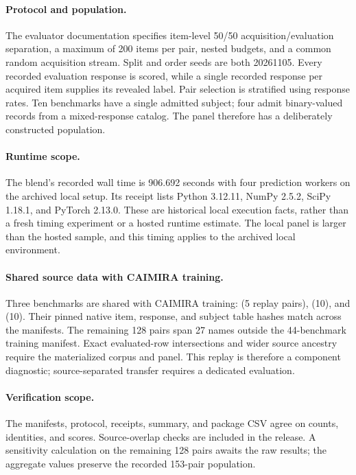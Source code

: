 \paragraph{Protocol and population.}
The evaluator documentation specifies item-level 50/50 acquisition/evaluation separation, a maximum of 200 items per pair, nested budgets, and a common random acquisition stream. Split and order seeds are both 20261105. Every recorded evaluation response is scored, while a single recorded response per acquired item supplies its revealed label. Pair selection is stratified using response rates. Ten benchmarks have a single admitted subject; four admit binary-valued records from a mixed-response catalog. The panel therefore has a deliberately constructed population.

\paragraph{Runtime scope.}
The blend's recorded wall time is 906.692 seconds with four prediction workers on the archived local setup. Its receipt lists Python 3.12.11, NumPy 2.5.2, SciPy 1.18.1, and PyTorch 2.13.0. These are historical local execution facts, rather than a fresh timing experiment or a hosted runtime estimate. The local panel is larger than the hosted sample, and this timing applies to the archived local environment.

\paragraph{Shared source data with CAIMIRA training.}
Three benchmarks are shared with CAIMIRA training:  (5 replay pairs),  (10), and  (10). Their pinned native item, response, and subject table hashes match across the manifests. The remaining 128 pairs span 27 names outside the 44-benchmark training manifest. Exact evaluated-row intersections and wider source ancestry require the materialized corpus and panel. This replay is therefore a component diagnostic; source-separated transfer requires a dedicated evaluation.

\paragraph{Verification scope.}
The manifests, protocol, receipts, summary, and package CSV agree on counts, identities, and scores. Source-overlap checks are included in the release. A sensitivity calculation on the remaining 128 pairs awaits the raw results; the aggregate values preserve the recorded 153-pair population.
